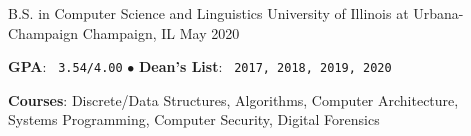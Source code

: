 

\begin{cventries}

  \cventry
    {B.S. in Computer Science and Linguistics} %
    {University of Illinois at Urbana-Champaign} %
    {Champaign, IL} %
    {May 2020} %
    {
      \begin{cvitems} %
        \item {\textbf{GPA}: \texttt{ 3.54/4.00} \qquad $\bullet$ \textbf{Dean's List}: \texttt{  2017, 2018, 2019, 2020}}
        \item {\textbf{Courses}: Discrete/Data Structures, Algorithms, Computer Architecture, Systems Programming, Computer Security, Digital Forensics}%
      \end{cvitems}
    }

\end{cventries}
